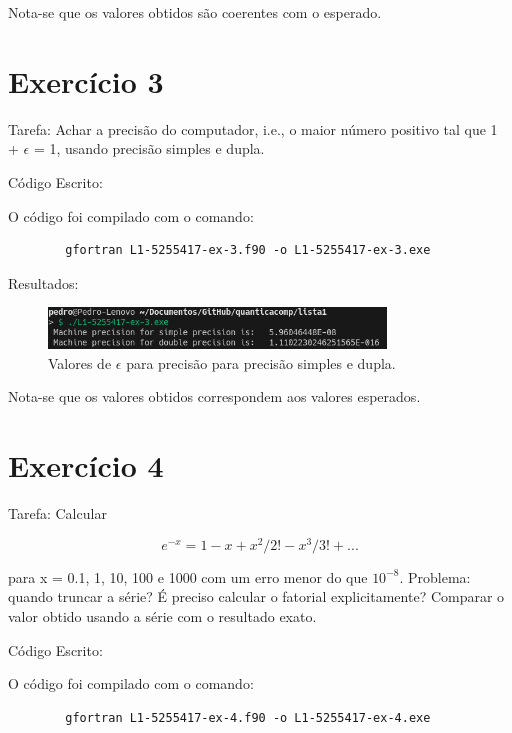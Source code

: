 \documentclass[12pt, a4paper]{article} %
\begin{document}
    Nota-se que os valores obtidos s\~ao coerentes com o esperado.

\section{Exerc\'icio 3}

    Tarefa: Achar a precis\~ao  do computador, i.e., o maior n\'umero positivo  tal que
    1 + $\epsilon$ = 1, usando precis\~ao simples e dupla.

    C\'odigo Escrito:
    

    O c\'odigo foi compilado com o comando:
    \begin{verbatim}
        gfortran L1-5255417-ex-3.f90 -o L1-5255417-ex-3.exe
    \end{verbatim}

    Resultados:
    \begin{figure}[H]
        \centering
        \includegraphics[width=0.8\textwidth]{../images/results-ex3.png}
        \caption{Valores de $\epsilon$ para precis\~ao para precis\~ao simples e dupla.}
    \end{figure}

    Nota-se que os valores obtidos correspondem aos valores esperados.

\section{Exerc\'icio 4}

    Tarefa: Calcular

    \begin{equation} e^{-x} = 1 - x + x^2/2! - x^3/3! + ... \end{equation}

    para x = 0.1, 1, 10, 100 e 1000 com um erro menor do que $10^{-8}$. Problema: quando truncar a s\'erie? \'E preciso calcular o fatorial explicitamente? Comparar o valor obtido usando a s\'erie com o resultado exato.

    C\'odigo Escrito:
    

    O c\'odigo foi compilado com o comando:
    \begin{verbatim}
        gfortran L1-5255417-ex-4.f90 -o L1-5255417-ex-4.exe
    \end{verbatim}
\end{document}
